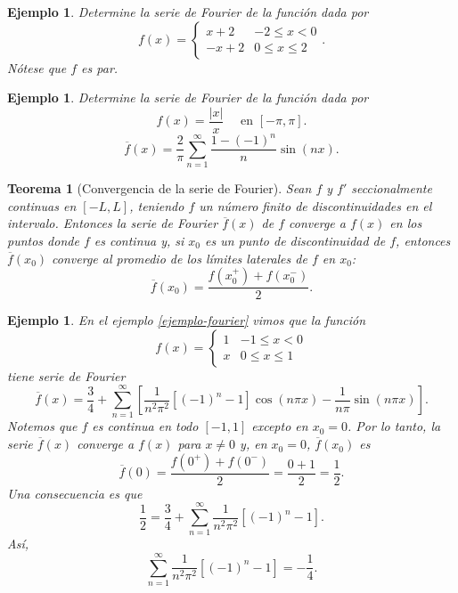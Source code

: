 \documentclass[11pt,letterpaper]{report}
\newtheorem{theorem}[defn]{Teorema}
\newtheorem{example}[defn]{Ejemplo}
\newcommand\<{\langle}
\renewcommand\>{\rangle}
\begin{document}
\begin{example}
  Determine la serie de Fourier de la función dada por
  \[
    f(x) =
    \begin{cases}
      x+2 & -2\leq x<0 \\
      -x+2 & 0\leq x\leq 2
    \end{cases}
  .\]
  Nótese que $f$ es par.
\end{example}

\begin{example}
  Determine la serie de Fourier de la función dada por
  \[
    f(x) = \frac{|x|}{x} \quad \text{ en } [-\pi,\pi]
  .\]
  \[
    \overline{f}(x)
    =
    \frac{2}{\pi}\sum_{n=1}^{\infty}\frac{1-(-1)^{n}}{n}\sin(nx)
  .\]
  
\end{example}

\begin{theorem}[Convergencia de la serie de Fourier]
  Sean $f$ y $f'$ seccionalmente continuas en $[-L,L]$, teniendo $f$
  un número finito de discontinuidades en el intervalo. Entonces la
  serie de Fourier $\overline{f}(x)$ de $f$ converge a $f(x)$ en los
  puntos donde $f$ es continua y, si $x_0$ es un punto de
  discontinuidad de $f$, entonces $\overline{f}(x_0)$ converge al
  promedio de los límites laterales de $f$ en $x_0$:
  \[
    \overline{f}(x_0) = \frac{f(x_0^{+})+f(x_0^{-})}{2}
  .\]
\end{theorem}

\begin{example}
  En el ejemplo \ref{ejemplo-fourier} vimos que la función
  \[
    f(x) =
    \begin{cases}
      1 & -1\leq x<0 \\
      x & 0\leq x\leq 1
    \end{cases}
  \]
  tiene serie de Fourier
  \[
    \overline{f}(x)
    =
    \frac{3}{4}
    +
    \sum_{n=1}^{\infty}
    \left[
      \frac{1}{n^{2}\pi^{2}}[(-1)^{n}-1]\cos(n\pi x)
      -\frac{1}{n\pi}\sin(n\pi x)
    \right]
  .\]
  Notemos que $f$ es continua en todo $[-1,1]$ excepto en $x_0=0$.
  Por lo tanto, la serie $\overline{f}(x)$ converge a $f(x)$ para
  $x\neq 0$ y, en $x_0=0$, $\overline{f}(x_0)$ es
  \[
    \overline{f}(0)
    =\frac{f(0^{+})+f(0^{-})}{2}
    = \frac{0+1}{2}
    =\frac{1}{2}
  .\]
  Una consecuencia es que
  \[
    \frac{1}{2} = \frac{3}{4} + 
    \sum_{n=1}^{\infty}
      \frac{1}{n^{2}\pi^{2}}[(-1)^{n}-1]
  .\]
  Así,
  \[
    \sum_{n=1}^{\infty}
      \frac{1}{n^{2}\pi^{2}}[(-1)^{n}-1]
    =
    - \frac{1}{4}
  .\]
\end{example}
\end{document}
